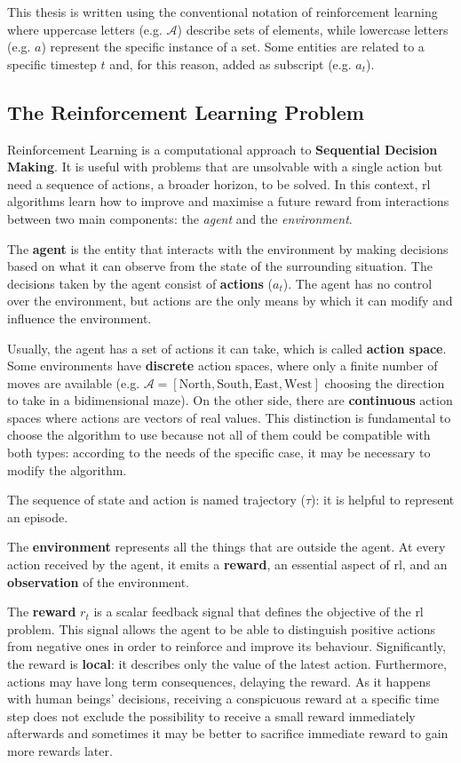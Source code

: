 This thesis is written using the conventional notation of reinforcement learning where uppercase letters (e.g. $\mathcal{A}$) describe sets of elements, while lowercase letters (e.g. $a$) represent the specific instance of a set. Some entities are related to a specific timestep $t$ and, for this reason, added as subscript (e.g. $a_t$).

\subsection{The Reinforcement Learning Problem}

Reinforcement Learning is a computational approach to \textbf{Sequential Decision Making}. It is useful with problems that are unsolvable with a single action but need a sequence of actions, a broader horizon, to be solved. In this context, \gls{rl} algorithms learn how to improve and maximise a future reward from interactions between two main components: the \textit{agent} and the \textit{environment}. 

The \textbf{agent} is the entity that interacts with the environment by making decisions based on what it can observe from the state of the surrounding situation. The decisions taken by the agent consist of \textbf{actions} ($a_t$).  The agent has no control over the environment, but actions are the only means by which it can modify and influence the environment.

Usually, the agent has a set of actions it can take, which is called \textbf{action space}.
Some environments have \textbf{discrete} action spaces, where only a finite number of moves are available (e.g. $\mathcal{A} = [\text{North}, \text{South}, \text{East}, \text{West}]$ choosing the direction to take in a bidimensional maze). On the other side, there are \textbf{continuous} action spaces where actions are vectors of real values.
This distinction is fundamental to choose the algorithm to use because not all of them could be compatible with both types: according to the needs of the specific case, it may be necessary to modify the algorithm.

The sequence of state and action is named trajectory ($\tau$): it is helpful to represent an episode.

The \textbf{environment} represents all the things that are outside the agent. At every action received by the agent, it emits a \textbf{reward}, an essential aspect of \gls{rl}, and an \textbf{observation} of the environment.

The \textbf{reward} $r_t$ is a scalar feedback signal that defines the objective of the \gls{rl} problem. This signal allows the agent to be able to distinguish positive actions from negative ones in order to reinforce and improve its behaviour. Significantly, the reward is \textbf{local}: it describes only the value of the latest action. Furthermore, actions may have long term consequences, delaying the reward. As it happens with human beings' decisions, receiving a conspicuous reward at a specific time step does not exclude the possibility to receive a small reward immediately afterwards and sometimes it may be better to sacrifice immediate reward to gain more rewards later.


